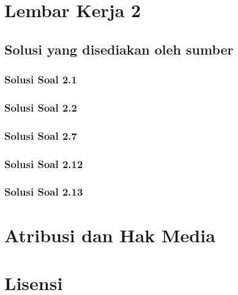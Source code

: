 \documentclass[11pt,a4paper,oneside]{book}
\begin{document}
\chapter{Lembar Kerja 2}


\section*{Solusi yang disediakan oleh sumber}
\subsection*{Solusi Soal 2.1}

\subsection*{Solusi Soal 2.2}

\subsection*{Solusi Soal 2.7}
\begingroup\scriptsize

\endgroup
\subsection*{Solusi Soal 2.12}
\begingroup\small

\endgroup
\subsection*{Solusi Soal 2.13}


\backmatter
\listoffigures
\chapter*{Atribusi dan Hak Media}


\chapter*{Lisensi}
\Lizenztext
\end{document}
